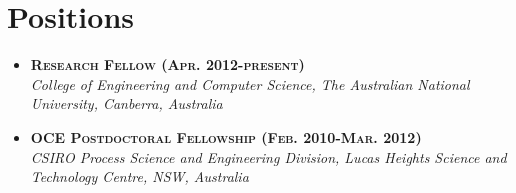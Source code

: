 \documentclass[11pt]{article}
\begin{document}
\section*{Positions}
\begin{itemize}
\item \textsc{\textbf{Research Fellow (Apr. 2012-present)}}\\
\emph{College of Engineering and Computer Science, The Australian National University, Canberra, Australia}\\

%
%
%
%


\item \textsc{\textbf{OCE Postdoctoral Fellowship (Feb. 2010-Mar. 2012)}}\\
\emph{CSIRO Process Science and Engineering Division, Lucas Heights Science and Technology Centre, NSW, Australia}\\

%
%
%
%



\end{itemize}
\end{document}
